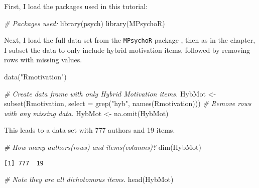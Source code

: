 \documentclass[
]{book}
\newenvironment{Shaded}{\begin{snugshade}}{\end{snugshade}}
\newcommand{\AttributeTok}[1]{\textcolor[rgb]{0.77,0.63,0.00}{#1}}
\newcommand{\CommentTok}[1]{\textcolor[rgb]{0.56,0.35,0.01}{\textit{#1}}}
\newcommand{\FunctionTok}[1]{\textcolor[rgb]{0.00,0.00,0.00}{#1}}
\newcommand{\NormalTok}[1]{#1}
\newcommand{\OtherTok}[1]{\textcolor[rgb]{0.56,0.35,0.01}{#1}}
\newcommand{\StringTok}[1]{\textcolor[rgb]{0.31,0.60,0.02}{#1}}
\begin{document}
First, I load the packages used in this tutorial:

\begin{Shaded}
\begin{Highlighting}[]
\CommentTok{\# Packages used:}
\FunctionTok{library}\NormalTok{(psych)}
\FunctionTok{library}\NormalTok{(MPsychoR)}
\end{Highlighting}
\end{Shaded}

Next, I load the full data set from the \texttt{MPsychoR} package \citep{Mair2020mpsychor}, then as in the chapter, I subset the data to only include hybrid motivation items, followed by removing rows with missing values.

\begin{Shaded}
\begin{Highlighting}[]
\FunctionTok{data}\NormalTok{(}\StringTok{"Rmotivation"}\NormalTok{)}

\CommentTok{\# Create data frame with only Hybrid Motivation items.}
\NormalTok{HybMot }\OtherTok{\textless{}{-}} \FunctionTok{subset}\NormalTok{(Rmotivation, }
                        \AttributeTok{select =} \FunctionTok{grep}\NormalTok{(}\StringTok{"hyb"}\NormalTok{, }\FunctionTok{names}\NormalTok{(Rmotivation)))}
\CommentTok{\# Remove rows  with any missing data.}
\NormalTok{HybMot }\OtherTok{\textless{}{-}} \FunctionTok{na.omit}\NormalTok{(HybMot)}
\end{Highlighting}
\end{Shaded}

This leads to a data set with 777 authors and 19 items.

\begin{Shaded}
\begin{Highlighting}[]
\CommentTok{\# How many authors(rows) and items(columns)?}
\FunctionTok{dim}\NormalTok{(HybMot)}
\end{Highlighting}
\end{Shaded}

\begin{verbatim}
[1] 777  19
\end{verbatim}

\begin{Shaded}
\begin{Highlighting}[]
\CommentTok{\# Note they are all dichotomous items.}
\FunctionTok{head}\NormalTok{(HybMot)}
\end{Highlighting}
\end{Shaded}
\end{document}

